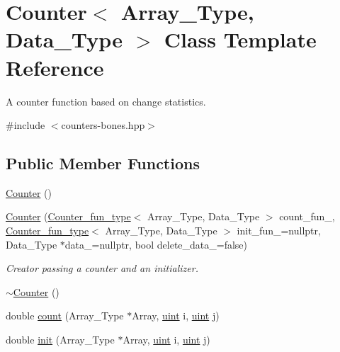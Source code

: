 \hypertarget{class_counter}{}\section{Counter$<$ Array\+\_\+\+Type, Data\+\_\+\+Type $>$ Class Template Reference}
\label{class_counter}


A counter function based on change statistics.  




{\ttfamily \#include $<$counters-\/bones.\+hpp$>$}

\subsection*{Public Member Functions}
\begin{DoxyCompactItemize}
\item 
\hyperlink{class_counter_a56c2f4ad875497dea97934cd3ddebc81}{Counter} ()
\item 
\hyperlink{class_counter_ad2a63c2b9b6c593d292dfd47e2f7a780}{Counter} (\hyperlink{typedefs_8hpp_ac0160f52f564dea3ac033b374cffbfe7}{Counter\+\_\+fun\+\_\+type}$<$ Array\+\_\+\+Type, Data\+\_\+\+Type $>$ count\+\_\+fun\+\_\+, \hyperlink{typedefs_8hpp_ac0160f52f564dea3ac033b374cffbfe7}{Counter\+\_\+fun\+\_\+type}$<$ Array\+\_\+\+Type, Data\+\_\+\+Type $>$ init\+\_\+fun\+\_\+=nullptr, Data\+\_\+\+Type $\ast$data\+\_\+=nullptr, bool delete\+\_\+data\+\_\+=false)
\begin{DoxyCompactList}\small\item\em Creator passing a counter and an initializer. \end{DoxyCompactList}\item 
\hyperlink{class_counter_a66594b4ffbbf337241b032c1f039b3c0}{$\sim$\+Counter} ()
\item 
double \hyperlink{class_counter_afe1d23e72c3bdca9b2481f36ebde1d95}{count} (Array\+\_\+\+Type $\ast$Array, \hyperlink{typedefs_8hpp_a91ad9478d81a7aaf2593e8d9c3d06a14}{uint} i, \hyperlink{typedefs_8hpp_a91ad9478d81a7aaf2593e8d9c3d06a14}{uint} j)
\item 
double \hyperlink{class_counter_ae0451979ddc51a5fbf00de78c37d3216}{init} (Array\+\_\+\+Type $\ast$Array, \hyperlink{typedefs_8hpp_a91ad9478d81a7aaf2593e8d9c3d06a14}{uint} i, \hyperlink{typedefs_8hpp_a91ad9478d81a7aaf2593e8d9c3d06a14}{uint} j)
\end{DoxyCompactItemize}
